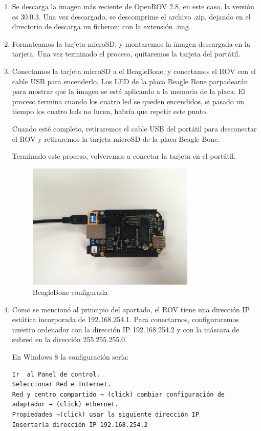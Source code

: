 \begin{enumerate}
\item Se descarga la imagen más reciente de OpenROV 2.8, en este caso, la versión es 30.0.3. Una vez descargado, se descomprime el archivo .zip, dejando en el directorio de descarga un ficherom con la extensión .img.
\item Formateamos la tarjeta microSD, y montaremos la imagen descargada en la tarjeta. Una vez terminado el proceso, quitaremos la tarjeta del portátil.
\item Conectamos la tarjeta microSD a el BeagleBone, y conectamos el ROV con el cable USB para encenderlo. Los LED de la placa Beagle Bone parpadearán para mostrar que la imagen se está aplicando a la memoria de la placa. El proceso termina cuando los cuatro led se queden encendidos, si pasado un tiempo los cuatro leds no lucen, habría que repetir este punto.

Cuando esté completo, retiraremos el cable USB del portátil para desconectar el ROV y retiraremos la tarjeta microSD de la placa Beagle Bone.

Terminado este proceso, volveremos a conectar la tarjeta en el portátil.
\newpage
\begin{figure} [hbtp]
\begin{center}
  \includegraphics[width=8cm]{img/cap3/3_4/BBB}
\end{center}
\caption{BeagleBone configurada}
\label{fig:bbb}
\end{figure}
\item Como se mencionó al principio del apartado, el ROV tiene una dirección IP estática incorporada de 192.168.254.1. Para conectarnos, configuraremos nuestro ordenador con la dirección IP 192.168.254.2 y con la máscara de subred en la dirección 255.255.255.0.

En Windows 8 la configuración sería:

\renewcommand{\lstlistingname}{Configuración}
\begin{lstlisting}[caption= Windows 8, label={lst:config_w8}]
Ir  al Panel de control.
Seleccionar Red e Internet.
Red y centro compartido → (click) cambiar configuración de adaptador → (click) ethernet.
Propiedades →(click) usar la siguiente dirección IP
Insertarla dirección IP 192.168.254.2
\end{lstlisting}


\end{enumerate}
